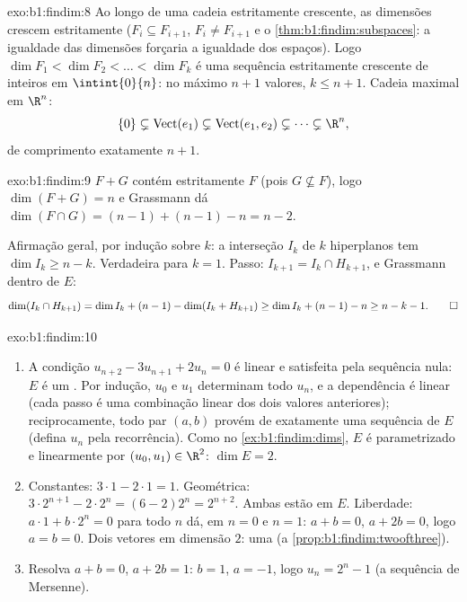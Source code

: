 \begin{solution}{exo:b1:findim:8}
Ao longo de uma cadeia estritamente crescente, as dimensões
crescem estritamente ($F_i \subseteq F_{i+1}$, $F_i \neq F_{i+1}$ e o \cref{thm:b1:findim:subspaces}: a igualdade das
dimensões forçaria a igualdade dos espaços). Logo $\dim F_1 < \dim F_2 < \dots < \dim F_k$ é uma
sequência estritamente crescente de inteiros em $\intint{0}{n}$: no máximo
$n + 1$ valores, $k \leq n + 1$. Cadeia maximal em $\R^n$:
\[
\{0\} \subsetneq \operatorname{Vect}(e_1) \subsetneq
\operatorname{Vect}(e_1, e_2) \subsetneq \dots \subsetneq \R^n ,
\]
de comprimento exatamente $n + 1$.
\end{solution}

\begin{solution}{exo:b1:findim:9}
$F + G$ contém estritamente $F$ (pois $G \not\subseteq F$), logo $\dim(F + G) = n$ e
Grassmann dá $\dim(F \cap G) = (n-1) +
(n-1) - n = n - 2$.

Afirmação geral, por indução sobre $k$: a interseção $I_k$ de $k$
hiperplanos tem $\dim I_k \geq n - k$. Verdadeira para $k = 1$. Passo: $I_{k+1}
= I_k \cap H_{k+1}$, e
Grassmann dentro de $E$:
\[
\dim(I_k \cap H_{k+1}) = \dim I_k + (n - 1) - \dim(I_k + H_{k+1})
\geq \dim I_k + (n-1) - n \geq n - k - 1 . \qedhere
\]
\end{solution}

\begin{solution}{exo:b1:findim:10}
\begin{enumerate}
  \item A condição $u_{n+2} - 3u_{n+1} + 2u_n = 0$ é linear e satisfeita pela sequência
        nula: $E$ é um . Por indução, $u_0$ e $u_1$
        determinam todo $u_n$, e a dependência é linear (cada
        passo é uma combinação linear dos dois valores
        anteriores); reciprocamente, todo par $(a, b)$ provém de
        exatamente uma sequência de $E$ (defina $u_n$ pela
        recorrência). Como no \cref{ex:b1:findim:dims}, $E$ é parametrizado 
        e linearmente por $(u_0, u_1) \in
        \R^2$: $\dim E = 2$.
  \item Constantes: $3\cdot1 - 2\cdot1 = 1$. Geométrica: $3\cdot
        2^{n+1} - 2\cdot 2^n = (6 - 2)2^n = 2^{n+2}$. Ambas estão em
        $E$. Liberdade: $a\cdot 1 + b\cdot 2^n = 0$ para todo $n$ dá, em $n = 0$ e
        $n = 1$: $a + b = 0$, $a + 2b = 0$, logo $a = b = 0$. Dois vetores 
        em dimensão $2$: uma  (a \cref{prop:b1:findim:twoofthree}).
  \item Resolva $a + b = 0$, $a + 2b = 1$: $b = 1$, $a = -1$, logo $u_n = 2^n - 1$
        (a sequência de Mersenne).
\end{enumerate}
\end{solution}

